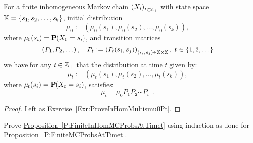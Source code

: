 {\begin{prop}\label{P:FiniteInHomMCProbsAtTimet}
For a finite inhomogeneous Markov chain $\left(X_t\right)_{t \in \mathbb{Z}_+}$ with state space $\mathbb{X}=\{s_1,s_2,\ldots,s_k\}$, initial distribution $$\mu_0 := \left( \mu_0(s_1), \mu_0(s_2), \ldots, \mu_0(s_k) \right),$$ where $\mu_0(s_i) = \mathbf{P}(X_0=s_i)$, and transition matrices 
$$\left(P_1,P_2,\ldots\right), \quad P_t := \left(P_t(s_i,s_j)\right)_{(s_i,s_j)\in \mathbb{X}\times \mathbb{X}}, \ t \in \{1,2,\ldots\}$$ we have for any $t \in \mathbb{Z}_+$ that the distribution at time $t$ given by:
$$\mu_t := \left( \mu_t(s_1), \mu_t(s_2), \ldots, \mu_t(s_k) \right),$$
where $\mu_t(s_i) = \mathbf{P}(X_t=s_i)$, satisfies:
\begin{equation}\label{E:InhomMutismu0Pt}
\mu_t = \mu_0 P_1 P_2 \cdots P_t \enspace .
\end{equation}
\begin{proof}
Left as \hyperref[Exr:ProveInHomMultismu0Pt]{Exercise~\ref*{Exr:ProveInHomMultismu0Pt}}.
\end{proof}
\end{prop}

\begin{exercise}\label{Exr:ProveInHomMultismu0Pt}
Prove \hyperref[P:FiniteInHomMCProbsAtTimet]{Proposition~\ref*{P:FiniteInHomMCProbsAtTimet}} using induction as done for \hyperref[P:FiniteMCProbsAtTimet]{Proposition~\ref*{P:FiniteMCProbsAtTimet}}.
\end{exercise}


}
